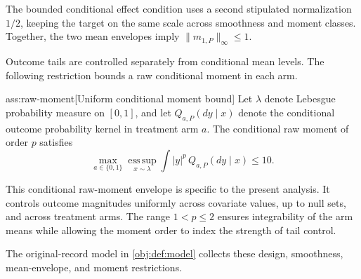 The bounded conditional effect condition uses a second stipulated normalization \(1/2\), keeping the target on the same scale across smoothness and moment classes. Together, the two mean envelopes imply \(\|m_{1,P}\|_\infty\le1\).

Outcome tails are controlled separately from conditional mean levels. The following restriction bounds a raw conditional moment in each arm.

\begin{assumptionv}{ass:raw-moment}[Uniform conditional moment bound]
Let \(\lambda\) denote Lebesgue probability measure on \([0,1]\), and let \(Q_{a,P}(dy\mid x)\) denote the conditional outcome probability kernel in treatment arm \(a\). The conditional raw moment of order \(p\) satisfies
\[
\max_{a\in\{0,1\}}
\operatorname*{ess\,sup}_{x\sim\lambda}
\int |y|^p\,Q_{a,P}(dy\mid x)\le 10.
\]
\end{assumptionv}

This conditional raw-moment envelope is specific to the present analysis. It controls outcome magnitudes uniformly across covariate values, up to null sets, and across treatment arms. The range \(1<p\le2\) ensures integrability of the arm means while allowing the moment order to index the strength of tail control.

The original-record model  in \cref{obj:def:model} collects these design, smoothness, mean-envelope, and moment restrictions.

